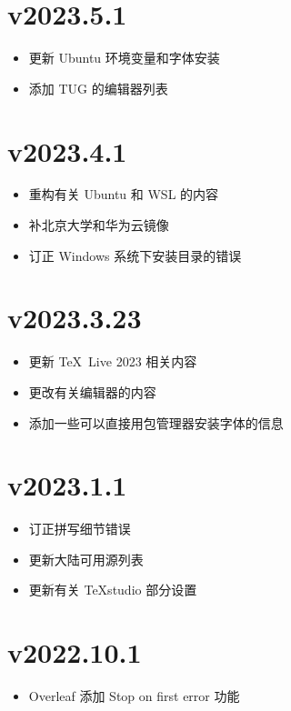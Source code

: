 \section*{v2023.5.1}

\begin{itemize}
  \item 更新 Ubuntu 环境变量和字体安装
  \item 添加 TUG 的编辑器列表
\end{itemize}

\section*{v2023.4.1}

\begin{itemize}
  \item 重构有关 Ubuntu 和 WSL 的内容
  \item 补北京大学和华为云镜像
  \item 订正 Windows 系统下安装目录的错误
\end{itemize}

\section*{v2023.3.23}

\begin{itemize}
  \item 更新 \TeX~Live 2023 相关内容
  \item 更改有关编辑器的内容
  \item 添加一些可以直接用包管理器安装字体的信息
\end{itemize}

\section*{v2023.1.1}

\begin{itemize}
  \item 订正拼写细节错误
  \item 更新大陆可用源列表
  \item 更新有关 \TeX studio 部分设置
\end{itemize}

\section*{v2022.10.1}

\begin{itemize}
  \item Overleaf 添加 Stop on first error 功能
\end{itemize}

